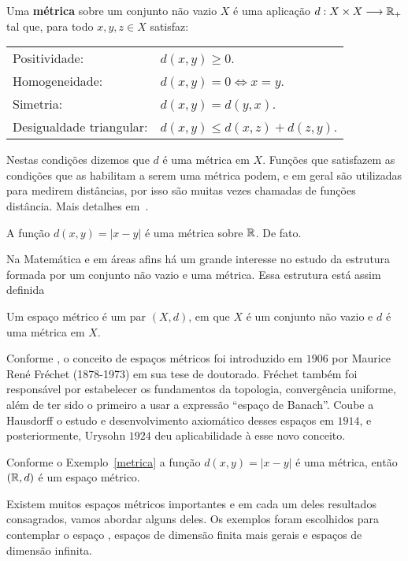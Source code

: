 \documentclass[glenn,refnum,codigo]{Estilo}
\begin{document}
\begin{define}[Métrica]
	Uma \textbf{métrica} sobre um conjunto não vazio $X$ é uma aplicação
	$d: X \times X \longrightarrow \mathbb{R}_+$ tal que, para todo $x,y,z\in X$
	satisfaz:
	\begin{center}
		\begin{tabular}{ll}
			Positividade:            & $d(x,y) \geqslant 0$.\\
			Homogeneidade:           & $d(x,y)=0 \Longleftrightarrow x=y$.\\
			Simetria:                & $d(x,y) = d(y, x)$.\\
			Desigualdade triangular: & $d(x,y) \leqslant d(x,z)+d(z,y)$.
		\end{tabular}
	\end{center}
\end{define}

Nestas condições dizemos que $d$ é uma métrica em $X$. Funções que satisfazem
as condições que as habilitam a serem uma métrica podem, e em geral são
utilizadas para medirem distâncias, por isso são muitas vezes chamadas de
funções distância. Mais detalhes em~\cite{Gabriel}.

\begin{exemplo}
	A função $d(x,y)=|x-y|$ é uma métrica sobre $\mathbb{R}$. De fato. \label{metrica}
\end{exemplo}

Na Matemática e em áreas afins há um grande interesse no estudo da
estrutura formada por um conjunto não vazio e uma métrica. Essa estrutura está
assim definida

\begin{define}
	Um espaço métrico é um par $(X , d)$, em que $X$ é um conjunto não vazio e $d$
	é uma métrica em $X$.
\end{define}


Conforme \cite{Frechet}, o conceito de espaços métricos foi introduzido em
$1906$ por Maurice René Fréchet (1878-1973) em sua tese de doutorado. Fréchet
também foi responsável por estabelecer os fundamentos da topologia, convergência
uniforme, além de ter sido o primeiro a usar a expressão ``espaço de Banach''.
Coube a Hausdorff o estudo e desenvolvimento axiomático desses espaços em
$1914$, e posteriormente, Urysohn $1924$ deu aplicabilidade à esse novo
conceito.

\begin{exemplo} Conforme o Exemplo~\ref{metrica} a função $d(x,y)=|x-y|$ é uma métrica,
	então $(\mathbb{R},d)$ é um espaço métrico.
\end{exemplo}
Existem muitos espaços métricos importantes e em cada um deles resultados
consagrados, vamos abordar alguns deles. Os exemplos foram escolhidos para
contemplar o espaço \rn, espaços de dimensão finita mais gerais e
espaços de dimensão infinita.
\end{document}
